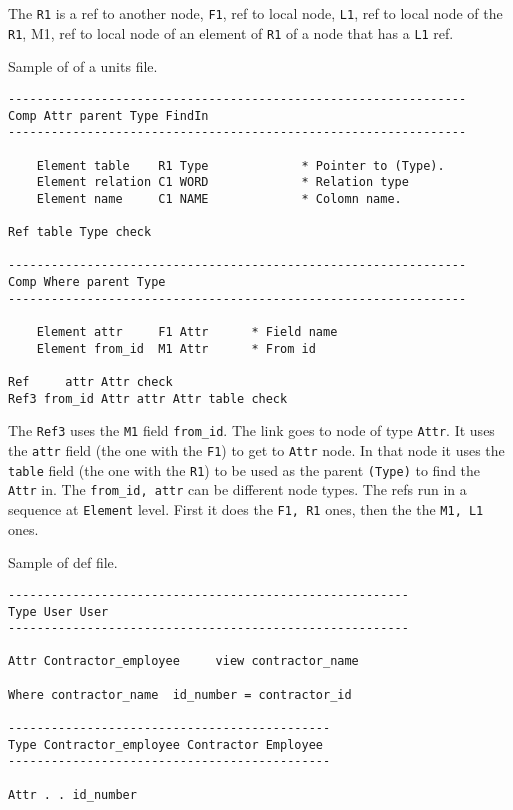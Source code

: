 The \texttt{R1} is a ref to another node, \texttt{F1}, ref to local
node, \texttt{L1}, ref to local node of the \texttt{R1}, M1, ref to
local node of an element of \texttt{R1} of a node that has a \texttt{L1}
ref.

Sample of of a units file.

\begin{verbatim}
----------------------------------------------------------------
Comp Attr parent Type FindIn
----------------------------------------------------------------

    Element table    R1 Type             * Pointer to (Type).
    Element relation C1 WORD             * Relation type
    Element name     C1 NAME             * Colomn name.

Ref table Type check

----------------------------------------------------------------
Comp Where parent Type
----------------------------------------------------------------

    Element attr     F1 Attr      * Field name
    Element from_id  M1 Attr      * From id

Ref     attr Attr check
Ref3 from_id Attr attr Attr table check
\end{verbatim}

The \texttt{Ref3} uses the \texttt{M1} field \texttt{from\_id}. The link
goes to node of type \texttt{Attr}. It uses the \texttt{attr} field (the
one with the \texttt{F1}) to get to \texttt{Attr} node. In that node it
uses the \texttt{table} field (the one with the \texttt{R1}) to be used
as the parent \texttt{(Type)} to find the \texttt{Attr} in. The
\texttt{from\_id,\ attr} can be different node types. The refs run in a
sequence at \texttt{Element} level. First it does the \texttt{F1,\ R1}
ones, then the the \texttt{M1,\ L1} ones.

Sample of def file.

\begin{verbatim}
--------------------------------------------------------
Type User User
--------------------------------------------------------

Attr Contractor_employee     view contractor_name

Where contractor_name  id_number = contractor_id

---------------------------------------------
Type Contractor_employee Contractor Employee
---------------------------------------------

Attr . . id_number
\end{verbatim}

